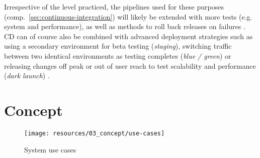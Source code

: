 \begin{appendices}
Irrespective of the level practiced, the pipelines used for these purposes (comp.~\autoref{sec:continuous-integration}) will likely be extended with more tests (e.g. system and performance), as well as methods to roll back releases on failures \cite[pp.~52--53]{chen2015continuous}. \ac{CD} can of course also be combined with advanced deployment strategies such as using a secondary environment for beta testing (\textit{staging}), switching traffic between two identical environments as testing completes (\textit{blue / green}) or releasing changes off peak or out of user reach to test scalability and performance (\textit{dark launch}) \cite[p.~23]{savor2016continuous}.


\chapter{Concept}
\label{app:concept}

\begin{figure}[hbt]
  \centering
  \texttt{[image: resources/03\_concept/use-cases]}
  \caption{System use cases}
  \label{fig:system-use-cases}
\end{figure}

\pagebreak
\FloatBarrier

\end{appendices}


